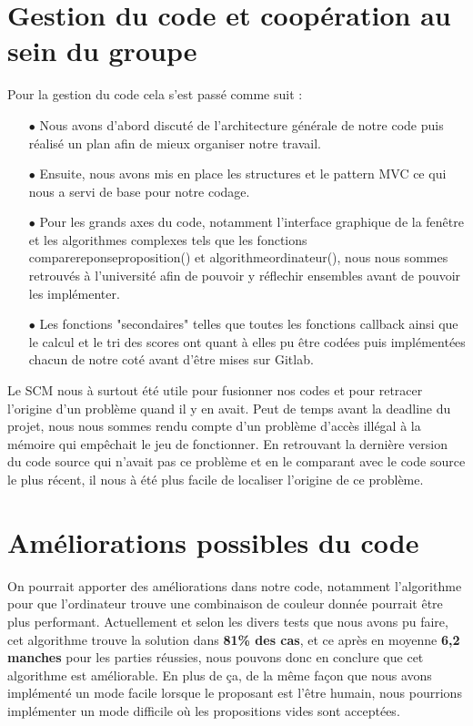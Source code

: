 \documentclass[a4paper, 11pt, oneside]{article}
\begin{document}
\section{Gestion du code et coopération au sein du groupe}
Pour la gestion du code cela s'est passé comme suit :
\begin{itemize}
    \item[$\bullet$] Nous avons d'abord discuté de l'architecture générale de notre code puis réalisé un plan afin de mieux organiser notre travail.
    \item[$\bullet$] Ensuite, nous avons mis en place les structures et le pattern MVC ce qui nous a servi de base pour notre codage.
    \item[$\bullet$] Pour les grands axes du code, notamment l'interface graphique de la fenêtre et les algorithmes complexes tels que les fonctions compare\textunderscore reponse\textunderscore proposition() et algorithme\textunderscore ordinateur(), nous nous sommes retrouvés à l'université afin de pouvoir y réflechir ensembles avant de pouvoir les implémenter.
    \item[$\bullet$] Les fonctions "secondaires" telles que toutes les fonctions callback ainsi que le calcul et le tri des scores ont quant à elles pu être codées puis implémentées chacun de notre coté avant d'être mises sur Gitlab. 
\end{itemize}
Le SCM nous à surtout été utile pour fusionner nos codes et pour retracer l'origine d'un problème quand il y en avait. Peut de temps avant la deadline du projet, nous nous sommes rendu compte d'un problème d'accès illégal à la mémoire qui empêchait le jeu de fonctionner. En retrouvant la dernière version du code source qui n'avait pas ce problème et en le comparant avec le code source le plus récent, il nous à été plus facile de localiser l'origine de ce problème.
\section{Améliorations possibles du code}
On pourrait apporter des améliorations dans notre code, notamment l'algorithme pour que l'ordinateur trouve une combinaison de couleur donnée pourrait être plus performant.
Actuellement et selon les divers tests que nous avons pu faire, cet algorithme trouve la solution dans \textbf{81\% des cas}, et ce après en moyenne \textbf{6,2 manches} pour les parties réussies, nous pouvons donc en conclure que cet algorithme est améliorable.
En plus de ça, de la même façon que nous avons implémenté un mode facile lorsque le proposant est l'être humain, nous pourrions implémenter un mode difficile où les propositions vides sont acceptées.
\end{document}
